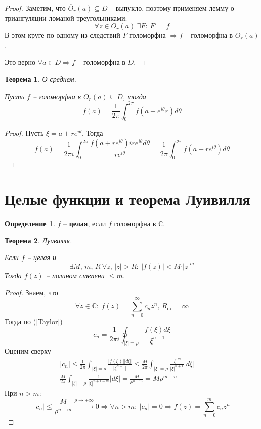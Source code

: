 \documentclass[a4paper,12pt]{article}
\renewcommand{\leq}{\ensuremath{\leqslant}}
\theoremstyle{plain}
\newtheorem{theorem}{Теорема}[section]
\theoremstyle{definition}
\newtheorem{definition}{Определение}[section]
\theoremstyle{remark}
\begin{document}
\begin{proof}
	Заметим, что $\overline{O}_r(a) \subseteq D$ -- выпукло, поэтому применяем лемму о триангуляции ломаной треугольниками:
	\[
		\forall z \in O_r(a) \: \exists F :\: F' = f
	\]
	В этом круге по одному из следствий $F$ голоморфна $\Rightarrow f$ -- голоморфна в $O_r(a)$.

	Это верно $\forall a \in D \Rightarrow f$ -- голоморфна в $D$.
\end{proof}

\begin{theorem}
	О среднем.

	Пусть $f$ -- голоморфна в $\overline{O}_r(a) \subseteq D$, тогда
	\[
		f(a) = \frac{1}{2\pi}\int_0^{2\pi}f(a + e^{i\theta}r)d\theta
	\]
\end{theorem}

\begin{proof}
	Пусть $\xi = a + re^{i\theta}$. Тогда
	\[
		f(a) = \frac{1}{2\pi i}\int_0^{2\pi}\frac{f(a + re^{i\theta})ire^{i\theta}d\theta}{re^{i\theta}} = \frac{1}{2\pi}\int_0^{2\pi}f(a + re^{i\theta})d\theta
	\]
\end{proof}

\section{Целые функции и теорема Луивилля}
\begin{definition}
	$f$ -- \textbf{целая}, если $f$ голоморфна в $\mathbb{C}$.
\end{definition}

\begin{theorem}\label{Lui}
	Луивилля.

	Если $f$ -- целая и
	\[
		\exists M,\,m,\,R \: \forall z,\, \vert z\vert > R :\: \vert f(z)\vert < M\cdot\vert z\vert^m
	\]
	Тогда $f(z)$ -- полином степени $\leq m$.
\end{theorem}

\begin{proof}
	Знаем, что
	\[
		\forall z \in \mathbb{C} :\: f(z) = \sum_{n = 0}^\infty c_nz^n,\, R_{\text{сх}} = \infty
	\]
	Тогда по (\ref{Taylor})
	\[
		c_n = \frac{1}{2\pi i}\oint_{\vert \xi\vert = \rho} \frac{f(\xi)d\xi}{\xi^{n + 1}}
	\]
	Оценим сверху
	\begin{align*}
		\vert c_n\vert \leq \frac{1}{2\pi}\int_{\vert \xi\vert = \rho} \frac{\vert f(\xi)\vert\vert d\xi\vert}{\vert\xi^{n + 1}\vert} \leq \frac{M}{2\pi}\int_{\vert \xi\vert = \rho}\frac{\vert \xi\vert^m}{\vert\xi\vert^{n + 1}}\vert d\xi\vert = \\
		\frac{M}{2\pi}\int_{\vert \xi\vert = \rho}\frac{1}{\vert \xi\vert^{n + 1 - m}}\vert d\xi\vert = \frac{M}{\rho^{n - m}} = M\rho^{m - n}
	\end{align*}
	При $n > m$:
	\[
		\vert c_n\vert \leq \frac{M}{\rho^{n - m}} \overset{\rho \to +\infty}{\to} 0 \Rightarrow \forall n > m :\: \vert c_n\vert = 0 \Rightarrow f(z) = \sum_{n = 0}^m c_nz^n
	\]
\end{proof}
\end{document}
